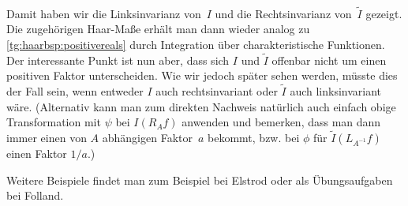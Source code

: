 \begin{BspList}[\label{tg:haarbsp}]
\begin{align*}
    \end{align*}
    Damit haben wir die Linksinvarianz von~$I$ und die Rechtsinvarianz
    von~$\tilde I$ gezeigt. Die zugehörigen Haar-Maße erhält man dann wieder
    analog zu \ref{tg:haarbsp:positivereals} durch Integration über
    charakteristische Funktionen. Der interessante Punkt ist nun aber, dass sich
    $I$ und $\tilde I$ offenbar nicht um einen positiven Faktor unterscheiden.
    Wie wir jedoch später %
    sehen werden, müsste dies der Fall sein, wenn entweder $I$ auch
    rechtsinvariant oder $\tilde I$ auch linksinvariant wäre.
    (Alternativ kann man zum direkten Nachweis natürlich auch einfach obige
    Transformation mit $\psi$ bei $I(R_Af)$ anwenden und bemerken, dass man dann
    immer einen von $A$ abhängigen Faktor~$a$ bekommt, bzw. bei $\phi$ für
    $\tilde I(L_{A^{-1}}f)$ einen Faktor $1/a$.)
    
\end{BspList}
%
Weitere Beispiele findet man zum Beispiel bei
Elstrod\cite[Kap.\,VIII,\;\S3,~und~3.14]{bookc:elstrod11}
oder als Übungsaufgaben bei 
Folland\cite[\S11,,\;Exercises]{bookc:folland99}.



































